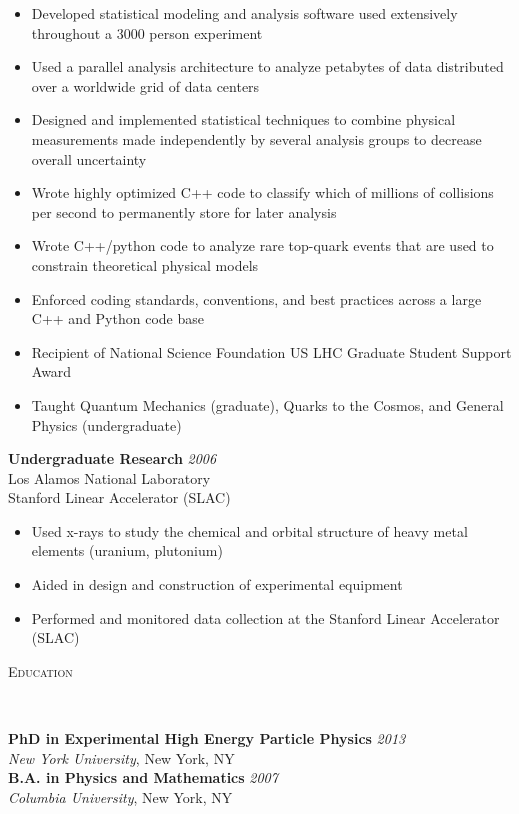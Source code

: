 \documentclass[9pt]{article}
\newenvironment{changemargin}[2]{%
  \begin{list}{}{%
    \setlength{\topsep}{0pt}%
    \setlength{\leftmargin}{#1}%
    \setlength{\rightmargin}{#2}%
    \setlength{\listparindent}{\parindent}%
    \setlength{\itemindent}{\parindent}%
    \setlength{\parsep}{\parskip}%
  }%
  \item[]}{\end{list}
}
\newcommand{\lineover}{
	\begin{changemargin}{-0.05in}{-0.05in}
		\vspace*{-8pt}
		\hrulefill \\
		\vspace*{-2pt}
	\end{changemargin}
}
\newcommand{\header}[1]{
	\begin{changemargin}{-0.5in}{-0.5in}
		\scshape{#1}\\
  	\lineover
	\end{changemargin}
}
\newenvironment{body} {
	\vspace*{-16pt}
	\begin{changemargin}{-0.25in}{-0.5in}
  }	
	{\end{changemargin}
}
\begin{document}
\begin{body}
        \begin{itemize}
        \item Developed statistical modeling and analysis software used extensively throughout a 3000 person experiment
        \item Used a parallel analysis architecture to analyze petabytes of data distributed over a worldwide grid of data centers
        \item Designed and implemented statistical techniques to combine physical measurements made independently by several analysis groups to decrease overall uncertainty
        \item Wrote highly optimized C++ code to classify which of millions of collisions per second to permanently store for later analysis
        \item Wrote C++/python code to analyze rare top-quark events that are used to constrain theoretical physical models
        \item Enforced coding standards, conventions, and best practices across a large C++ and Python code base
        \item Recipient of National Science Foundation US LHC Graduate Student Support Award
        \item Taught Quantum Mechanics (graduate), Quarks to the Cosmos, and General Physics (undergraduate)

        \end{itemize}

        \medskip

	\textbf {Undergraduate Research} \hfill \emph{2006}\\
        Los Alamos National Laboratory \\
        Stanford Linear Accelerator (SLAC) \\

        \begin{itemize}
          \item Used x-rays to study the chemical and orbital structure of heavy metal elements (uranium, plutonium)
          \item Aided in design and construction of experimental equipment
          \item Performed and monitored data collection at the Stanford Linear Accelerator (SLAC) 
        \end{itemize}

\end{body}

\smallskip

\header{Education}

\begin{body}
	\vspace{14pt}
	\textbf{PhD in Experimental High Energy Particle Physics }{} \hfill \emph{2013}{} \\
	\emph{New York University}, New York, NY{} \\
  \medskip
	\textbf{B.A. in Physics and Mathematics} \hfill \emph{2007} \\
	\emph{Columbia University}, New York, NY\\
\end{body}
\end{document}
